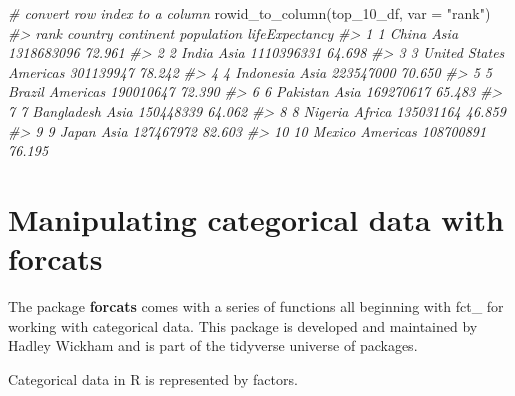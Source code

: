 \documentclass[
]{book}
\newenvironment{Shaded}{\begin{snugshade}}{\end{snugshade}}
\newcommand{\AttributeTok}[1]{\textcolor[rgb]{0.77,0.63,0.00}{#1}}
\newcommand{\CommentTok}[1]{\textcolor[rgb]{0.56,0.35,0.01}{\textit{#1}}}
\newcommand{\FunctionTok}[1]{\textcolor[rgb]{0.00,0.00,0.00}{#1}}
\newcommand{\NormalTok}[1]{#1}
\newcommand{\StringTok}[1]{\textcolor[rgb]{0.31,0.60,0.02}{#1}}
\begin{document}
\begin{Shaded}
\begin{Highlighting}[]
\CommentTok{\# convert row index to a column}
\FunctionTok{rowid\_to\_column}\NormalTok{(top\_10\_df, }\AttributeTok{var =} \StringTok{"rank"}\NormalTok{)}
\CommentTok{\#\textgreater{}    rank       country continent population lifeExpectancy}
\CommentTok{\#\textgreater{} 1     1         China      Asia 1318683096         72.961}
\CommentTok{\#\textgreater{} 2     2         India      Asia 1110396331         64.698}
\CommentTok{\#\textgreater{} 3     3 United States  Americas  301139947         78.242}
\CommentTok{\#\textgreater{} 4     4     Indonesia      Asia  223547000         70.650}
\CommentTok{\#\textgreater{} 5     5        Brazil  Americas  190010647         72.390}
\CommentTok{\#\textgreater{} 6     6      Pakistan      Asia  169270617         65.483}
\CommentTok{\#\textgreater{} 7     7    Bangladesh      Asia  150448339         64.062}
\CommentTok{\#\textgreater{} 8     8       Nigeria    Africa  135031164         46.859}
\CommentTok{\#\textgreater{} 9     9         Japan      Asia  127467972         82.603}
\CommentTok{\#\textgreater{} 10   10        Mexico  Americas  108700891         76.195}
\end{Highlighting}
\end{Shaded}

\hypertarget{tr-factor}{%
\section{Manipulating categorical data with forcats}\label{tr-factor}}

The package \textbf{forcats} comes with a series of functions all beginning with fct\_ for working with categorical data. This package is developed and maintained by Hadley Wickham and is part of the tidyverse universe of packages.

Categorical data in R is represented by factors.
\end{document}
